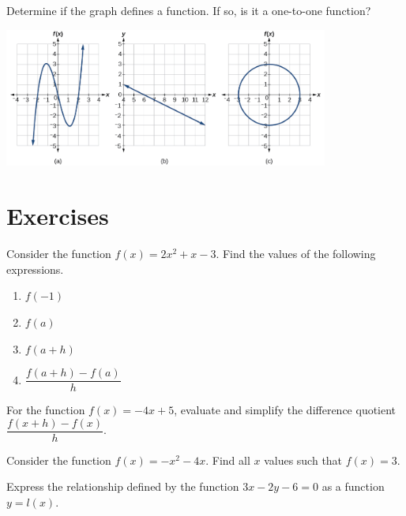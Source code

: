 \begin{example}
  Determine if the graph defines a function. If so, is it a one-to-one function?
  \begin{center}
  \includegraphics[width=0.8\textwidth]{figs/cubic-line-circle.jpg}
  \end{center}
\end{example}

\newpage
\section*{Exercises}

\begin{exercise}
  Consider the function $f(x)=2x^2+x-3$. Find the values of the following expressions.

\begin{enumerate}[fourcol]
  \item \(f(-1)\)
  \item \(f(a)\)
  \item \(f(a+h)\)
  \item \(\dfrac{f(a+h)-f(a)}{h}\)
\end{enumerate}
\end{exercise}
\vspace*{2\baselineskip}

\begin{exercise}
  For the function $f(x)=-4x+5$, evaluate and simplify the difference quotient $\dfrac{f(x+h)-f(x)}{h}$.
\end{exercise}
\vspace*{2\baselineskip}

\begin{exercise}
  Consider the function $f(x)=-x^2-4x$. Find all $x$ values such that $f(x)=3$.
\end{exercise}

\newpage

\begin{exercise}
  Express the relationship defined by the function $3x-2y-6=0$ as a function $y=l(x)$.
\end{exercise}

